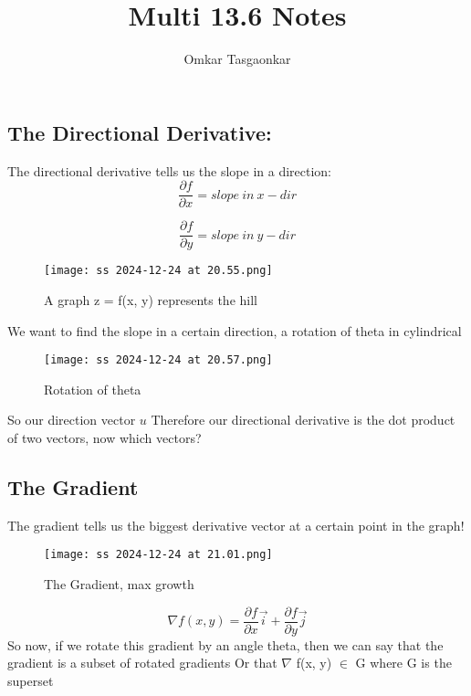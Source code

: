 \documentclass{article}
\title{Multi 13.6 Notes}
\author{Omkar Tasgaonkar}
\begin{document}
\maketitle
\tableofcontents
\listoffigures
\pagebreak

\subsection{The Directional Derivative:}

The directional derivative tells us the slope in a direction:\\

\begin{equation}
\frac{\partial f}{\partial x} =  slope\ in\ x-dir
\end{equation}

\begin{equation}
\frac{\partial f}{\partial y} =  slope\ in\ y-dir
\end{equation}

\begin{figure}[h]
\caption{A graph z = f(x, y) represents the hill}
\centering
\texttt{[image: ss 2024-12-24 at 20.55.png]}
\end{figure}
We want to find the slope in a certain direction, a rotation of theta in cylindrical

\begin{figure}[h]
\caption{Rotation of theta}
\centering
\texttt{[image: ss 2024-12-24 at 20.57.png]}
\end{figure}
So our direction vector $u$
Therefore our directional derivative is the dot product of two vectors, now which vectors?\\

\subsection{The Gradient}

The gradient tells us the biggest derivative vector at a certain point in the graph!

\begin{figure}[h]
\caption{The Gradient, max growth}
\centering
\texttt{[image: ss 2024-12-24 at 21.01.png]}
\end{figure}

\begin{equation}
\nabla f(x,y) = \frac{\partial f}{\partial x}\vec{i}+\frac{\partial f}{\partial y}\vec{j}
\end{equation}
So now, if we rotate this gradient by an angle theta, then we can say that the gradient is a subset of rotated gradients
Or that $\nabla$ f(x, y) $\in$ G where G is the superset\\
\end{document}
